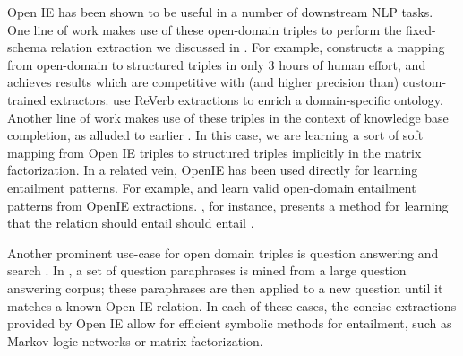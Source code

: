 Open IE has been shown to be useful in a number of downstream NLP tasks.
One line of work makes use of these open-domain triples to perform
  the fixed-schema relation extraction we discussed in .
For example, \cite{key:2013soderland-kbp} constructs a mapping from open-domain
  to structured triples in only 3 hours of human effort, and achieves results
  which are competitive with (and higher precision than) custom-trained
  extractors.
 use ReVerb extractions to 
    enrich a domain-specific ontology.
Another line of work makes use of these triples in the context of knowledge
  base completion, as alluded to earlier \cite{key:2012yao-schemas,key:2013riedel-schemas}.
In this case, we are learning a sort of soft mapping from Open IE triples to
  structured triples implicitly in the matrix factorization.
In a related vein, OpenIE has been used directly for learning entailment patterns.
For example,  and 
  learn valid open-domain entailment patterns from OpenIE extractions.
, for instance, presents a method for learning
  that the relation  should entail  should entail
  .

Another prominent use-case for open domain triples is
  question answering and search \cite{key:2014fader-openqa,key:2011etzioni-nature}. 
In , a set of question paraphrases is mined from a large
  question answering corpus; these paraphrases are then applied to a new question until
  it matches a known Open IE relation.
In each of these cases, the concise extractions provided by Open IE allow
  for efficient symbolic methods for entailment, such as Markov logic
  networks or matrix factorization.


%
%

